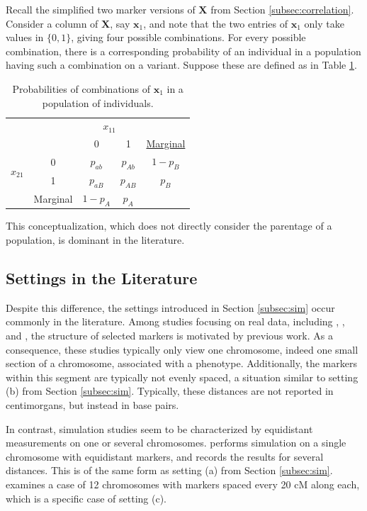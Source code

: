 \documentclass{article}
\newcommand{\ve}[1]{\mathbf{#1}}           %
\newcommand{\m}[1]{\mathbf{#1}}               %
\begin{document}
Recall the simplified two marker versions of $\m{X}$ from Section \ref{subsec:correlation}. Consider a column of $\m{X}$, say $\ve{x}_1$, and note that the two entries of $\ve{x}_1$ only take values in $\{0,1\}$, giving four possible combinations. For every possible combination, there is a corresponding probability of an individual in a population having such a combination on a variant. Suppose these are defined as in Table \ref{tab:r2}.

\begin{table}[!ht]
  \centering
  \begin{tabular}{c c| c c| c}
    & \multicolumn{1}{c}{} & \multicolumn{2}{c}{$x_{11}$} & \\ \cline{3-4}
    & & 0 & 1 & \underline{Marginal} \\ \cline{2-4}
    \multirow{2}{*}{$x_{21}$} & \multicolumn{1}{|c|}{0} & $p_{ab}$ & $p_{Ab}$ & $1-p_B$ \\
    & \multicolumn{1}{|c|}{1} & $p_{aB}$ & $p_{AB}$ & $p_B$ \\ \cline{2-4}
    & \multicolumn{1}{c}{Marginal} & \multicolumn{1}{c}{$1 - p_A$} & \multicolumn{1}{c}{$p_A$} &  \\ 
  \end{tabular}
  \caption{Probabilities of combinations of $\ve{x}_1$ in a population of individuals.}
  \label{tab:r2}
\end{table}

This conceptualization, which does not directly consider the parentage of a population, is dominant in the literature.

\subsection{Settings in the Literature} \label{subsec:inlit}

Despite this difference, the settings introduced in Section \ref{subsec:sim} occur commonly in the literature. Among studies focusing on real data, including \cite{Galwey2009}, \cite{nyholt2004}, and \cite{Salyakina2005}, the structure of selected markers is motivated by previous work. As a consequence, these studies typically only view one chromosome, indeed one small section of a chromosome, associated with a phenotype. Additionally, the markers within this segment are typically not evenly spaced, a situation similar to setting (b) from Section \ref{subsec:sim}. Typically, these distances are not reported in centimorgans, but instead in base pairs.

In contrast, simulation studies seem to be characterized by equidistant measurements on one or several chromosomes. \cite{cheverud2001} performs simulation on a single chromosome with equidistant markers, and records the results for several distances. This is of the same form as setting (a) from Section \ref{subsec:sim}. \cite{LanderBotstein1989} examines a case of 12 chromosomes with markers spaced every 20 cM along each, which is a specific case of setting (c).
\end{document}
